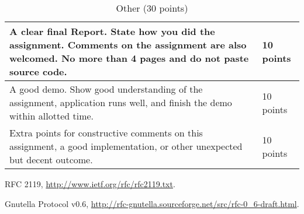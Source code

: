 \documentclass[12pt, a4paper]{article}
\begin{document}
\begin{table}[htdp]
\caption{Other (30 points)}
\begin{center}
\begin{tabular}{|p{12cm}|p{2cm}|}
\hline
A clear final Report.
State how you did the assignment.
Comments on the assignment are also welcomed.
No more than 4 pages and do not paste source code. & 10 points \\
\hline
A good demo.
Show good understanding of the assignment, application runs well, and finish the demo within allotted time. & 10 points \\
\hline
Extra points for constructive comments on this assignment, a good implementation, or other unexpected but decent outcome. & 10 points \\

\hline
\end{tabular}
\end{center}
\end{table}


\FloatBarrier

\begin{thebibliography}{1}

RFC 2119, \url{http://www.ietf.org/rfc/rfc2119.txt}.

Gnutella Protocol v0.6, \url{http://rfc-gnutella.sourceforge.net/src/rfc-0\_6-draft.html}.

\end{thebibliography}
\end{document}
